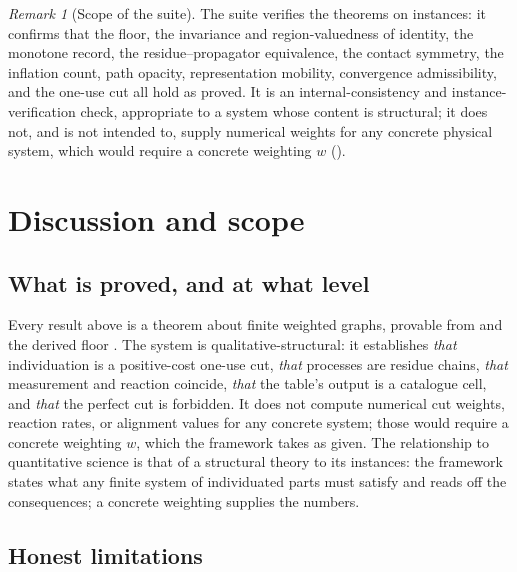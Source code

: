 \documentclass[11pt,twocolumn,a4paper]{article}
\theoremstyle{thmstyle}
\theoremstyle{definition}
\theoremstyle{remark}
\newtheorem{remark}[theorem]{Remark}
\newcommand{\wt}{w}
\begin{document}
\begin{remark}[Scope of the suite]
\label{rem:validation-scope}
The suite verifies the theorems on instances: it confirms that the floor,
the invariance and region-valuedness of identity, the monotone record, the
residue--propagator equivalence, the contact symmetry, the inflation
count, path opacity, representation mobility, convergence admissibility,
and the one-use cut all hold as proved. It is an internal-consistency and
instance-verification check, appropriate to a system whose content is
structural; it does not, and is not intended to, supply numerical weights
for any concrete physical system, which would require a concrete weighting
$\wt$ ().
\end{remark}

\section{Discussion and scope}
\label{sec:discussion}

\subsection{What is proved, and at what level}

Every result above is a theorem about finite weighted graphs, provable from
 and the derived floor . The system is
qualitative-structural: it establishes \emph{that} individuation is a
positive-cost one-use cut, \emph{that} processes are residue chains,
\emph{that} measurement and reaction coincide, \emph{that} the table's
output is a catalogue cell, and \emph{that} the perfect cut is forbidden.
It does not compute numerical cut weights, reaction rates, or alignment
values for any concrete system; those would require a concrete weighting
$\wt$, which the framework takes as given. The relationship to quantitative
science is that of a structural theory to its instances: the framework
states what any finite system of individuated parts must satisfy and reads
off the consequences; a concrete weighting supplies the numbers.

\subsection{Honest limitations}
\end{document}
